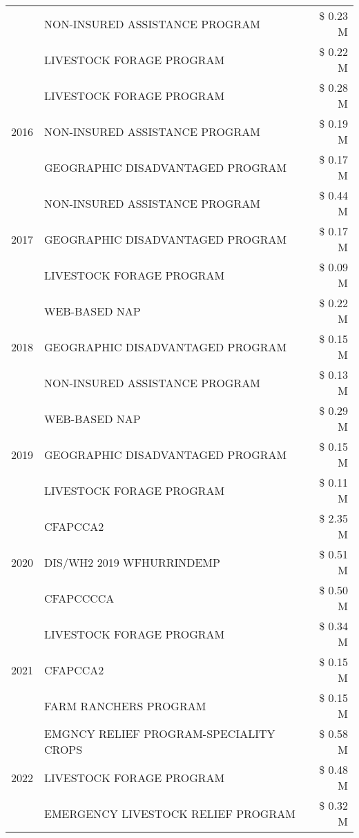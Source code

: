 \begin{tabular}{llr}
 & NON-INSURED ASSISTANCE PROGRAM & \$ 0.23 M \\
 & LIVESTOCK FORAGE PROGRAM & \$ 0.22 M \\
\cline{1-3}
\multirow[t]{3}{*}{2016} & LIVESTOCK FORAGE PROGRAM & \$ 0.28 M \\
 & NON-INSURED ASSISTANCE PROGRAM & \$ 0.19 M \\
 & GEOGRAPHIC DISADVANTAGED PROGRAM & \$ 0.17 M \\
\cline{1-3}
\multirow[t]{3}{*}{2017} & NON-INSURED ASSISTANCE PROGRAM & \$ 0.44 M \\
 & GEOGRAPHIC DISADVANTAGED PROGRAM & \$ 0.17 M \\
 & LIVESTOCK FORAGE PROGRAM & \$ 0.09 M \\
\cline{1-3}
\multirow[t]{3}{*}{2018} & WEB-BASED NAP & \$ 0.22 M \\
 & GEOGRAPHIC DISADVANTAGED PROGRAM & \$ 0.15 M \\
 & NON-INSURED ASSISTANCE PROGRAM & \$ 0.13 M \\
\cline{1-3}
\multirow[t]{3}{*}{2019} & WEB-BASED NAP & \$ 0.29 M \\
 & GEOGRAPHIC DISADVANTAGED PROGRAM & \$ 0.15 M \\
 & LIVESTOCK FORAGE PROGRAM & \$ 0.11 M \\
\cline{1-3}
\multirow[t]{3}{*}{2020} & CFAPCCA2 & \$ 2.35 M \\
 & DIS/WH2 2019 WFHURRINDEMP & \$ 0.51 M \\
 & CFAPCCCCA & \$ 0.50 M \\
\cline{1-3}
\multirow[t]{3}{*}{2021} & LIVESTOCK FORAGE PROGRAM & \$ 0.34 M \\
 & CFAPCCA2 & \$ 0.15 M \\
 & FARM RANCHERS PROGRAM & \$ 0.15 M \\
\cline{1-3}
\multirow[t]{3}{*}{2022} & EMGNCY RELIEF PROGRAM-SPECIALITY CROPS & \$ 0.58 M \\
 & LIVESTOCK FORAGE PROGRAM & \$ 0.48 M \\
 & EMERGENCY LIVESTOCK RELIEF PROGRAM & \$ 0.32 M \\
\cline{1-3}
\bottomrule
\end{tabular}

